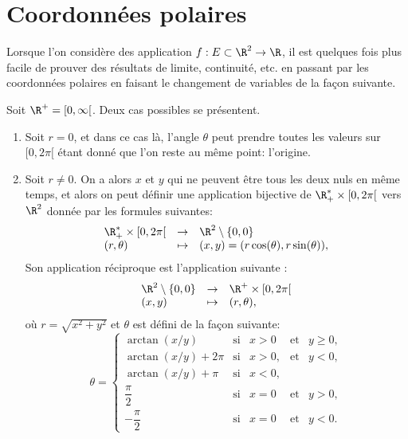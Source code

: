 \documentclass[class=report,crop=false]{standalone}
\begin{document}
\section{Coordonnées polaires}
Lorsque l'on considère des application $f: E \subset \R^2 \rightarrow \R$, il est quelques fois plus facile de prouver des résultats de limite, continuité, etc. en passant par les coordonnées polaires en faisant le changement de variables de la façon suivante.


\textcolor[rgb]{0.00,0.00,1.00}{
Soit $\R^+=[0,\infty[$. Deux cas possibles se présentent. 
\begin{enumerate}
\item Soit $r=0$, et dans ce cas là, l'angle $\theta$ peut prendre toutes les valeurs
sur $[0,2 \pi[$ étant donné que l'on reste au même point: l'origine.
\item Soit $r \neq 0$. On a alors $x$ et $y$ qui ne peuvent être tous les deux nuls en même temps,  et alors on peut définir une 
application bijective de $\R_{+}^* \times [0, 2\pi[$
vers $\R^2$ donnée par les formules suivantes:
\begin{equation*}
\begin{array}{lll}
\R_{+}^* \times [0, 2\pi[ & \rightarrow  & \R^2 \setminus\lbrace 0,0 \rbrace \\
(r,\theta) & \mapsto & (x,y)=(r \cos (\theta), r \sin(\theta)),
\end{array}
\end{equation*}
Son application réciproque est l'application 
suivante :
\begin{equation*}
\begin{array}{lll}
\R^2\setminus\lbrace 0,0 \rbrace  & \rightarrow  & \R^+ \times [0, 2\pi[ \\
(x,y) & \mapsto & (r,\theta),
\end{array}
\end{equation*}
où $r= \sqrt{x^2+y^2}$ et $\theta$ est défini de la façon suivante:
\begin{equation*}
\theta=\left\{
\begin{array}{lllll}
\arctan(x/y) & \mathrm{si}& x>0 & \mathrm{et}& y \geq 0,\\
\arctan(x/y)+2\pi & \mathrm{si}& x>0 ,& \mathrm{et} & y<0,\\
\arctan(x/y)+ \pi & \mathrm{si}& x<0 ,& & \\
\dfrac{\pi}{2}& \mathrm{si}& x=0 & \mathrm{et} & y>0,\\
- \dfrac{\pi}{2} & \mathrm{si}& x=0 & \mathrm{et} & y<0.
\end{array} \right.
\end{equation*}
\end{enumerate}
}
\end{document}
